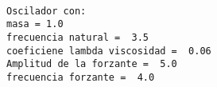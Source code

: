 \documentclass[11pt]{article}
\begin{document}
    \begin{center}
    \end{center}
    { \hspace*{\fill} \\}
    
    \begin{Verbatim}[commandchars=\\\{\}]
Oscilador con:
masa = 1.0
frecuencia natural =  3.5
coeficiene lambda viscosidad =  0.06
Amplitud de la forzante =  5.0
frecuencia forzante =  4.0

    \end{Verbatim}

    \begin{center}
    \end{center}
    { \hspace*{\fill} \\}
    

    
    
    
    
\end{document}
